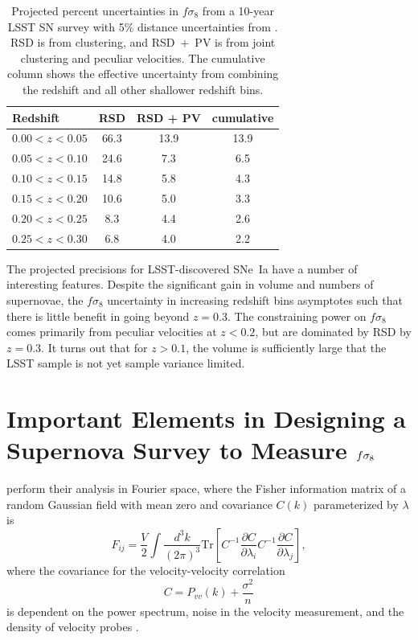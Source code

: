 \documentclass{aastex62}   	%
\begin{document}
\begin{table}
   \centering
   \begin{tabular}{@{} lccc @{}} %
	\hline
	Redshift & RSD & RSD + PV & cumulative\\ \hline
      $0.00<z<0.05$   & 66.3 & 13.9 & 13.9\\
     $0.05<z<0.10$            & 24.6     &  7.3 & 6.5\\
     $0.10<z<0.15$      & 14.8  & 5.8 & 4.3\\
     $0.15<z<0.20$      & 10.6  & 5.0 & 3.3\\
      $0.20<z<0.25$     & 8.3  & 4.4 & 2.6\\
     $0.25<z<0.30$  & 6.8  &  4.0 & 2.2\\
      \hline
   \end{tabular}
   \caption{Projected percent uncertainties in $f\sigma_8$ from a 10-year LSST SN survey with 5\% distance uncertainties from
   \citet{2017ApJ...847..128H}. RSD is from clustering, and RSD~+~PV is from joint clustering and peculiar velocities.
   The cumulative column shows the effective uncertainty from combining the redshift and all other shallower redshift bins.}
   \label{tab:howlett}
\end{table}

The projected precisions for LSST-discovered SNe~Ia have a number of interesting features. 
Despite the significant gain in volume and numbers of supernovae, the $f\sigma_8$ uncertainty in increasing redshift bins asymptotes such that 
there is little benefit in going beyond
$z=0.3$.
The constraining power on  $f\sigma_8$ 
comes primarily from peculiar velocities
at $z<0.2$, but are dominated by RSD by $z=0.3$.
It turns out that for $z>0.1$, the volume is sufficiently large that the LSST sample is not yet sample variance limited.

\section{Important Elements in Designing a Supernova Survey to Measure $\MakeLowercase{f}\sigma_8$}
\citet{2017ApJ...847..128H} perform their analysis in Fourier space, 
where the Fisher information matrix of a random Gaussian field with mean zero and covariance $C(k)$ parameterized by $\lambda$ is
\begin{equation}
F_{ij} = \frac{V}{2}\int \frac{d^3k}{(2\pi)^3} \text{Tr}\left[ C^{-1} \frac{\partial C}{\partial \lambda_i} C^{-1}
\frac{\partial C}{\partial \lambda_j} \right],
\end{equation}
where the covariance for the velocity-velocity correlation
\begin{equation}
C = P_{vv}(k) + \frac{\sigma^2}{n}
\label{cov:eq}
\end{equation}
is dependent on the power spectrum, noise in the velocity measurement, and the density of velocity probes
\citep{2017MNRAS.464.2517H}. 
\end{document}
